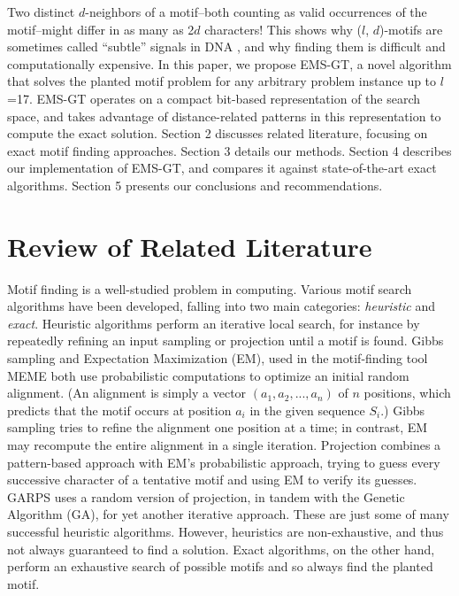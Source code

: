 \documentclass{acm_proc_article-sp}
\begin{document}
			\vspace{-3mm}
	Two distinct $d$-neighbors of a motif--both counting as valid occurrences of the motif--might differ in as many as 2$d$ characters! This shows why ($l$, $d$)-motifs are sometimes called ``subtle'' signals in DNA  \cite{pevzner2000combinatorial}, and why finding them is difficult and computationally expensive.
	In this paper, we propose EMS-GT, a novel algorithm that solves the planted motif problem for any arbitrary problem instance up to $l$=17. EMS-GT operates on a compact bit-based representation of the search space, and takes advantage of distance-related patterns in this representation to compute the exact solution. Section 2 discusses related literature, focusing on exact motif finding approaches. Section 3 details our methods. Section 4 describes our implementation of EMS-GT, and compares it against state-of-the-art exact algorithms. Section 5 presents our conclusions and recommendations.

\section{Review of Related Literature}

	Motif finding is a well-studied problem in computing. Various motif search algorithms have been developed, falling into two main categories: \emph{heuristic} and \emph{exact}.
	Heuristic algorithms perform an iterative local search, for instance by repeatedly refining an input sampling or projection until a motif is found. Gibbs sampling \cite{lawrence1993detecting} and Expectation Maximization (EM), used in the motif-finding tool MEME \cite{lawrence1990expectation,bailey1995unsupervised} both use probabilistic computations to optimize an initial random alignment. (An alignment is simply a vector $(a_{1}, a_{2},...,a_{n})$ of $n$ positions, which predicts that the motif occurs at position $a_{i}$ in the given sequence $S_{i}$.) Gibbs sampling tries to refine the alignment one position at a time; in contrast, EM may recompute the entire alignment in a single iteration. Projection \cite{blanchette2002discovery} combines a pattern-based approach with EM's probabilistic approach,  trying to guess every successive character of a tentative motif and using EM to verify its guesses. GARPS \cite{huo2009combining} uses a random version of projection, in tandem with the Genetic Algorithm (GA), for yet another iterative approach. These are just some of many successful heuristic algorithms. However, heuristics are non-exhaustive, and thus not always guaranteed to find a solution. Exact algorithms, on the other hand, perform an exhaustive search of possible motifs and so always find the planted motif. 
\end{document}
